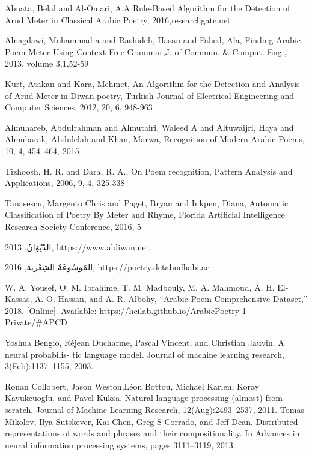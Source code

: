 \begin{thebibliography}{999}
Abuata, Belal and Al-Omari‏, A,A Rule-Based Algorithm for the Detection of Arud Meter in Classical Arabic Poetry, 2016‏,researchgate.net‏

 Alnagdawi, Mohammad a and Rashideh, Hasan and Fahed, Ala, Finding Arabic Poem Meter Using Context Free Grammar,J. of Commun. {\&} Comput. Eng., 2013, volume  3,1,52-59

 Kurt, Atakan and Kara, Mehmet, An Algorithm for the Detection and Analysis of Arud Meter in Diwan poetry, Turkish Journal of Electrical Engineering and Computer Sciences, 2012, 20, 6, 948-963

 Almuhareb, Abdulrahman and Almutairi, Waleed A and Altuwaijri, Haya and Almubarak, Abdulelah and Khan, Marwa, Recognition of Modern Arabic Poems, 10, 4, 454--464, 2015

 Tizhoosh, H. R. and Dara, R. A., On Poem recognition, Pattern Analysis and Applications, 2006, 9, 4, 325-338

 Tanasescu, Margento Chris and Paget, Bryan and Inkpen, Diana, Automatic Classification of Poetry By Meter and Rhyme, Florida Artificial Intelligence Research Society Conference, 2016, 5

 \textarabic{الدّيْوَانُ}, 2013, https://www.aldiwan.net.

\textarabic{المَوسُوعَةُ الشِعْرية}, 2016, https://poetry.dctabudhabi.ae

 W. A. Yousef, O. M. Ibrahime, T. M. Madbouly, M. A. Mahmoud, A. H. El-Kassas, A. O. Hassan, and A. R. Albohy, “Arabic Poem Comprehensive Dataset,” 2018. [Online]. Available: https://hcilab.github.io/ArabicPoetry-1-Private/\#APCD

    Yoshua Bengio, Réjean Ducharme,
Pascal Vincent, and Christian Jauvin. A neural probabilis-
tic language model. Journal of machine learning research,
3(Feb):1137–1155, 2003.

 Ronan Collobert, Jason Weston,Léon Bottou, Michael Karlen, Koray Kavukcuoglu, and Pavel Kuksa. Natural language processing (almost) from scratch. Journal of Machine Learning Research, 12(Aug):2493–2537, 2011.
 Tomas Mikolov, Ilya Sutskever, Kai Chen, Greg S Corrado, and Jeff Dean. Distributed representations of words and phrases and their compositionality. In Advances in neural information processing systems, pages 3111–3119, 2013.


\end{thebibliography}
